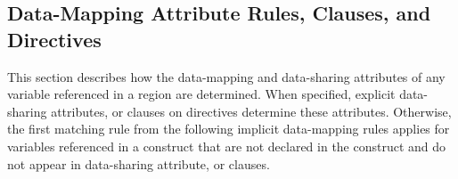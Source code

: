 \subsection{Data-Mapping Attribute Rules, Clauses, and Directives}
\label{subsec:Data-Mapping Attribute Rules, Clauses, and Directives}
This section describes how the data-mapping and data-sharing attributes of
any variable referenced in a  region are determined. When specified,
explicit data-sharing attributes,  or  clauses on
 directives determine these attributes.  Otherwise, the first matching 
rule from the following implicit data-mapping rules applies for variables referenced
in a  construct that are not declared in the construct and do not appear 
in data-sharing attribute,  or  clauses.

